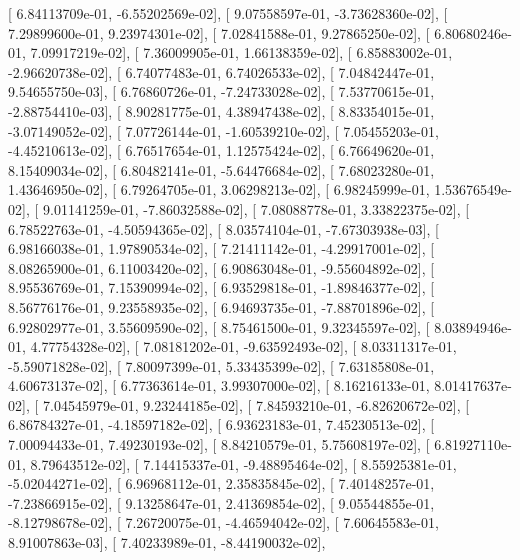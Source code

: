 \documentclass{article}
\begin{document}
       [  6.84113709e-01,  -6.55202569e-02],
       [  9.07558597e-01,  -3.73628360e-02],
       [  7.29899600e-01,   9.23974301e-02],
       [  7.02841588e-01,   9.27865250e-02],
       [  6.80680246e-01,   7.09917219e-02],
       [  7.36009905e-01,   1.66138359e-02],
       [  6.85883002e-01,  -2.96620738e-02],
       [  6.74077483e-01,   6.74026533e-02],
       [  7.04842447e-01,   9.54655750e-03],
       [  6.76860726e-01,  -7.24733028e-02],
       [  7.53770615e-01,  -2.88754410e-03],
       [  8.90281775e-01,   4.38947438e-02],
       [  8.83354015e-01,  -3.07149052e-02],
       [  7.07726144e-01,  -1.60539210e-02],
       [  7.05455203e-01,  -4.45210613e-02],
       [  6.76517654e-01,   1.12575424e-02],
       [  6.76649620e-01,   8.15409034e-02],
       [  6.80482141e-01,  -5.64476684e-02],
       [  7.68023280e-01,   1.43646950e-02],
       [  6.79264705e-01,   3.06298213e-02],
       [  6.98245999e-01,   1.53676549e-02],
       [  9.01141259e-01,  -7.86032588e-02],
       [  7.08088778e-01,   3.33822375e-02],
       [  6.78522763e-01,  -4.50594365e-02],
       [  8.03574104e-01,  -7.67303938e-03],
       [  6.98166038e-01,   1.97890534e-02],
       [  7.21411142e-01,  -4.29917001e-02],
       [  8.08265900e-01,   6.11003420e-02],
       [  6.90863048e-01,  -9.55604892e-02],
       [  8.95536769e-01,   7.15390994e-02],
       [  6.93529818e-01,  -1.89846377e-02],
       [  8.56776176e-01,   9.23558935e-02],
       [  6.94693735e-01,  -7.88701896e-02],
       [  6.92802977e-01,   3.55609590e-02],
       [  8.75461500e-01,   9.32345597e-02],
       [  8.03894946e-01,   4.77754328e-02],
       [  7.08181202e-01,  -9.63592493e-02],
       [  8.03311317e-01,  -5.59071828e-02],
       [  7.80097399e-01,   5.33435399e-02],
       [  7.63185808e-01,   4.60673137e-02],
       [  6.77363614e-01,   3.99307000e-02],
       [  8.16216133e-01,   8.01417637e-02],
       [  7.04545979e-01,   9.23244185e-02],
       [  7.84593210e-01,  -6.82620672e-02],
       [  6.86784327e-01,  -4.18597182e-02],
       [  6.93623183e-01,   7.45230513e-02],
       [  7.00094433e-01,   7.49230193e-02],
       [  8.84210579e-01,   5.75608197e-02],
       [  6.81927110e-01,   8.79643512e-02],
       [  7.14415337e-01,  -9.48895464e-02],
       [  8.55925381e-01,  -5.02044271e-02],
       [  6.96968112e-01,   2.35835845e-02],
       [  7.40148257e-01,  -7.23866915e-02],
       [  9.13258647e-01,   2.41369854e-02],
       [  9.05544855e-01,  -8.12798678e-02],
       [  7.26720075e-01,  -4.46594042e-02],
       [  7.60645583e-01,   8.91007863e-03],
       [  7.40233989e-01,  -8.44190032e-02],
\end{document}
